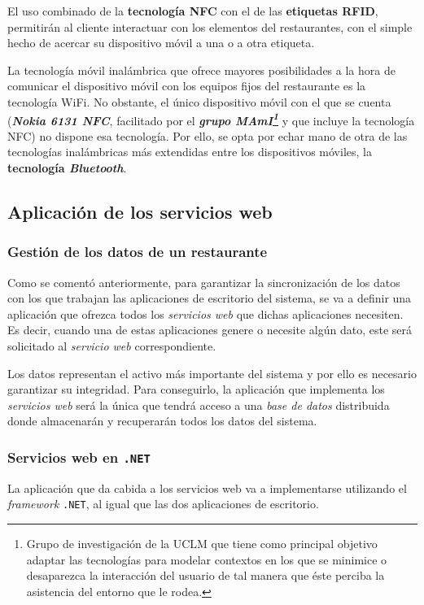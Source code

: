   El uso combinado de la \textbf{tecnología \acs{NFC}} con el de las
  \textbf{etiquetas \acs{RFID}}, permitirán al cliente interactuar con los
  elementos del restaurantes, con el simple hecho de acercar su dispositivo
  móvil a una o a otra etiqueta.

  La tecnología móvil inalámbrica que ofrece mayores posibilidades a la hora
  de comunicar el dispositivo móvil con los equipos fijos del restaurante es
  la tecnología \acs{WiFi}. No obstante, el único dispositivo móvil con el que
  se cuenta (\emph{\textbf{Nokia 6131 \acs{NFC}}}, facilitado por el
  \textbf{\emph{grupo \acs{MAmI}\footnote{Grupo de investigación de la
  \acs{UCLM} que tiene como principal objetivo adaptar las tecnologías para 
  modelar contextos en los que se minimice o desaparezca la interacción del 
  usuario de tal manera que éste perciba la asistencia del entorno que le 
  rodea.}}} y que incluye la tecnología \acs{NFC}) no
  dispone esa tecnología. Por ello, se opta por echar mano de otra de las
  tecnologías inalámbricas más extendidas entre los dispositivos móviles, la
  \textbf{tecnología \emph{Bluetooth}}.

  \subsection{Aplicación de los servicios web}
  \label{subsec:webServicesApp}
    \subsubsection{Gestión de los datos de un restaurante}
  Como se comentó anteriormente, para garantizar la sincronización de los
datos con los que trabajan las aplicaciones de escritorio del sistema, se va a
definir una aplicación que ofrezca todos los \emph{servicios web} que dichas
aplicaciones necesiten. Es decir, cuando una de estas aplicaciones genere o
necesite algún dato, este será solicitado al \emph{servicio web}
correspondiente.

  Los datos representan el activo más importante del sistema y por ello es
necesario garantizar su integridad. Para conseguirlo, la aplicación que
implementa los \emph{servicios web} será la única que tendrá acceso a una
\emph{base de datos} distribuida donde almacenarán y recuperarán todos los
datos del sistema.

    \subsubsection{Servicios web en \texttt{.NET}}
La aplicación que da cabida a los servicios web va a implementarse utilizando
el \emph{framework} \texttt{.NET}, al igual que las dos aplicaciones de
escritorio.

